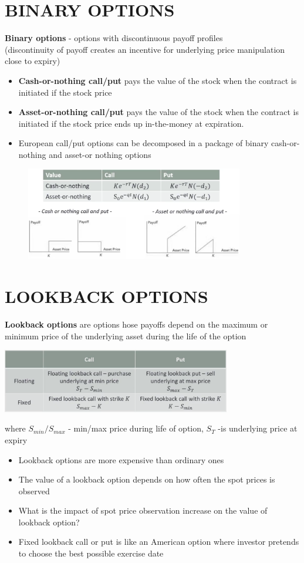 \documentclass{article}
\begin{document}
\section{BINARY OPTIONS}
{\bf Binary options} - options with discontinuous payoff profiles \\(discontinuity of payoff creates an incentive for underlying price manipulation close to expiry)
\begin{itemize}
    \item {\bf Cash-or-nothing call/put} pays the value of the stock when the contract is initiated if the stock price
    \item {\bf Asset-or-nothing call/put} pays the value of the stock when the contract is initiated if the stock price ends up in-the-money at expiration.
    \item European call/put options can be decomposed in a package of binary cash-or-nothing and asset-or nothing options
\end{itemize}
\begin{figure}[h]
\centering
\includegraphics[width=0.85\textwidth]{Binary_opritons.png}\\
\end{figure}

\section{LOOKBACK OPTIONS}
{\bf Lookback options} are options hose payoffs depend on the maximum or minimum price of the underlying asset during the life of the option\\
\begin{center}
\includegraphics[width=0.75\textwidth]{Lookback_options.png}
\end{center}
where $S_{min}/S_{max}$ - min/max price during life of option, $S_T$ -is underlying price at expiry
\begin{itemize}
    \item Lookback options are more expensive than ordinary ones
    \item The value of a lookback option depends on how often the spot prices is observed 
    \item What is the impact of spot price observation increase on the value of lookback option?
    \item Fixed lookback call or put is like an American option where investor pretends to choose the best possible exercise date
\end{itemize}
\end{document}
